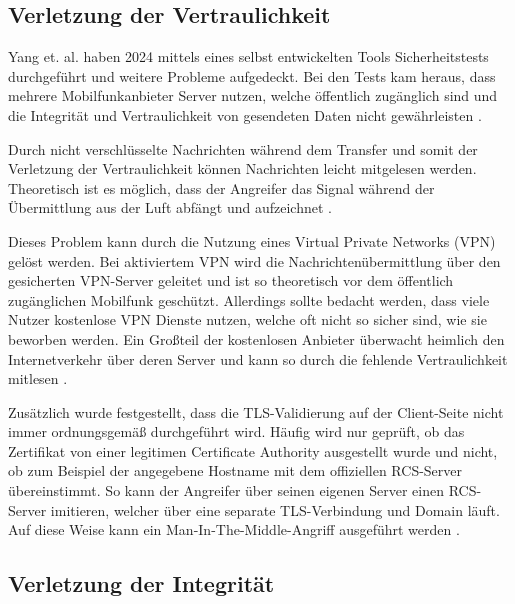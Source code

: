 \documentclass[conference]{IEEEtran}
\begin{document}
\subsection{Verletzung der Vertraulichkeit}

Yang et. al. \cite{uncoversec} haben 2024 mittels eines selbst entwickelten Tools Sicherheitstests durchgeführt und weitere Probleme aufgedeckt.
Bei den Tests kam heraus, dass mehrere Mobilfunkanbieter Server nutzen, welche öffentlich zugänglich sind und die Integrität und Vertraulichkeit von gesendeten Daten nicht gewährleisten \cite{uncoversec}.

Durch nicht verschlüsselte Nachrichten während dem Transfer und somit der Verletzung der Vertraulichkeit können Nachrichten leicht mitgelesen werden.
Theoretisch ist es möglich, dass der Angreifer das Signal während der Übermittlung aus der Luft abfängt und aufzeichnet \cite{uncoversec}.

Dieses Problem kann durch die Nutzung eines Virtual Private Networks (VPN) gelöst werden.
Bei aktiviertem VPN wird die Nachrichtenübermittlung über den gesicherten VPN-Server geleitet und ist so theoretisch vor dem öffentlich zugänglichen Mobilfunk geschützt.
Allerdings sollte bedacht werden, dass viele Nutzer kostenlose VPN Dienste nutzen, welche oft nicht so sicher sind, wie sie beworben werden.
Ein Großteil der kostenlosen Anbieter überwacht heimlich den Internetverkehr über deren Server und kann so durch die fehlende Vertraulichkeit mitlesen \cite{uncoversec}.

Zusätzlich wurde festgestellt, dass die TLS-Validierung auf der Client-Seite nicht immer ordnungsgemäß durchgeführt wird.
Häufig wird nur geprüft, ob das Zertifikat von einer legitimen Certificate Authority ausgestellt wurde und nicht, ob zum Beispiel der angegebene Hostname mit dem offiziellen RCS-Server übereinstimmt.
So kann der Angreifer über seinen eigenen Server einen RCS-Server imitieren, welcher über eine separate TLS-Verbindung und Domain läuft.
Auf diese Weise kann ein Man-In-The-Middle-Angriff ausgeführt werden \cite{uncoversec}.

\subsection{Verletzung der Integrität}
\end{document}
